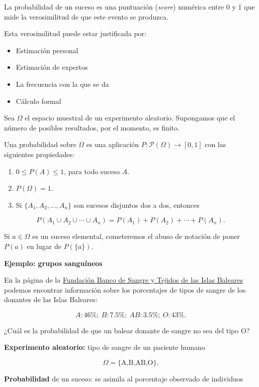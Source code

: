 \documentclass[
  letterpaper,
  DIV=11,
  numbers=noendperiod]{scrreprt}
\providecommand{\tightlist}{%
  \setlength{\itemsep}{0pt}\setlength{\parskip}{0pt}}\usepackage{longtable,booktabs,array}
\begin{document}
La probabilidad de un suceso es una puntuación (\emph{score}) numérica
entre 0 y 1 que mide la verosimilitud de que este evento se produzca.

Esta verosimilitud puede estar justificada por:

\begin{itemize}
\tightlist
\item
  Estimación personal
\item
  Estimación de expertos
\item
  La frecuencia con la que se da
\item
  Cálculo formal
\end{itemize}

Sea \(\Omega\) el espacio muestral de un experimento aleatorio.
Supongamos que el número de posibles resultados, por el momento, es
finito.

Una probabilidad sobre \(\Omega\) es una aplicación
\(P:\mathcal{P}(\Omega)\to [0,1]\) con las siguientes propiedades:

\begin{enumerate}
\def\labelenumi{\arabic{enumi}.}
\tightlist
\item
  \(0\leq P(A)\leq 1\), para todo suceso \(A\).
\item
  \(P(\Omega)=1\).
\item
  Si \(\{A_1,A_2,\ldots,A_n\}\) son sucesos disjuntos dos a dos,
  entonces
\end{enumerate}

\[
P(A_1\cup A_2\cup \cdots \cup A_n)=P(A_1)+P(A_2)+\cdots +P(A_n).
\]

Si \(a\in \Omega\) es un suceso elemental, cometeremos el abuso de
notación de poner \(P(a)\) en lugar de \(P(\{a\})\).

\textbf{Ejemplo: grupos sanguíneos}

En la página de la
\href{http://www.donasang.org/que-es-la-sang/es_frequencies-dels-diferents-grups.html}{Fundación
Banco de Sangre y Tejidos de las Islas Baleares} podemos encontrar
información sobre los porcentajes de tipos de sangre de los donantes de
las Islas Baleares:

\[A: 46\%;\ B: 7.5\%;\ AB: 3.5\%;\ O: 43\%.\]

¿Cuál es la probabilidad de que un balear donante de sangre no sea del
tipo O?

\textbf{Experimento aleatorio:} tipo de sangre de un paciente humano

\[\Omega=\{\mbox{A,B,AB,O}\}.\]

\textbf{Probabilidad} de un suceso: se asimila al porcentaje observado
de individuos
\end{document}
